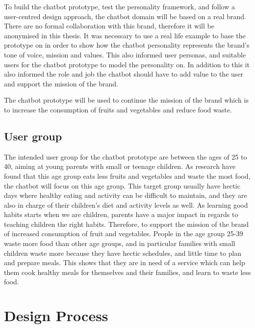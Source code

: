 To build the chatbot prototype, test the personality framework, and follow a user-centred design approach, the chatbot domain will be based on a real brand. There are no formal collaboration with this brand, therefore it will be anonymised in this thesis. It was necessary to use a real life example to base the prototype on in order to show how the chatbot personality represents the brand's tone of voice, mission and values. This also informed user personas, and suitable users for the chatbot prototype to model the personality on. In addition to this it also informed the role and job the chatbot should have to add value to the user and support the mission of the brand.

The chatbot prototype will be used to continue the mission of the brand which is to increase the consumption of fruits and vegetables and reduce food waste. 


\subsection{User group}

The intended user group for the chatbot prototype are between the ages of 25 to 40, aiming at young parents with small or teenage children. As research have found that this age group eats less fruits and vegetables and waste the most food, the chatbot will focus on this age group. This target group usually have hectic days where healthy eating and activity can be difficult to maintain, and they are also in charge of their children’s diet and activity levels as well. As learning good habits starts when we are children, parents have a major impact in regards to teaching children the right habits. Therefore, to support the mission of the brand of increased consumption of fruit and vegetables. People in the age group 25-39 waste more food than other age groups, and in particular families with small children waste more because they have hectic schedules, and little time to plan and prepare meals. This shows that they are in need of a service which can help them cook healthy meals for themselves and their families, and learn to waste less food.


\section{Design Process}


